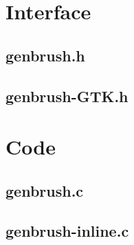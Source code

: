 \section{Interface}

\subsection{genbrush.h}

\begin{scriptsize}
\begin{ttfamily}

\end{ttfamily}
\end{scriptsize}

\subsection{genbrush-GTK.h}

\begin{scriptsize}
\begin{ttfamily}

\end{ttfamily}
\end{scriptsize}

\section{Code}

\subsection{genbrush.c}

\begin{scriptsize}
\begin{ttfamily}

\end{ttfamily}
\end{scriptsize}

\subsection{genbrush-inline.c}

\begin{scriptsize}
\begin{ttfamily}

\end{ttfamily}
\end{scriptsize}

